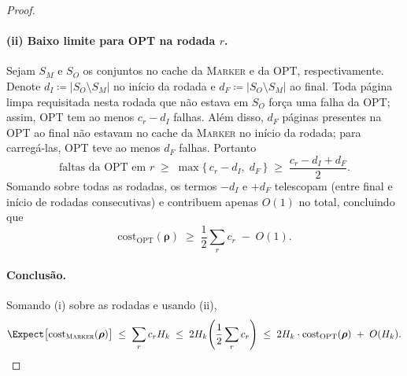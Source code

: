 \begin{theorem}
\begin{proof}
\paragraph{(ii) Baixo limite para OPT na rodada $r$.}
Sejam $S_M$ e $S_O$ os conjuntos no cache da \textsc{Marker} e da OPT, respectivamente.
Denote $d_I \coloneqq |S_O \setminus S_M|$ no início da rodada e $d_F \coloneqq |S_O \setminus S_M|$ ao final.
Toda página limpa requisitada nesta rodada que não estava em $S_O$ força uma falha da OPT; assim, OPT tem ao menos $c_r - d_I$ falhas.
Além disso, $d_F$ páginas presentes na OPT ao final não estavam no cache da \textsc{Marker} no início da rodada; para carregá-las, OPT teve ao menos $d_F$ falhas. Portanto
\[
\text{faltas da OPT em $r$} \;\ge\; \max\{\,c_r - d_I,\; d_F\,\} \;\ge\; \frac{c_r - d_I + d_F}{2}.
\]
Somando sobre todas as rodadas, os termos $-d_I$ e $+d_F$ telescopam (entre final e início de rodadas consecutivas) e contribuem apenas $O(1)$ no total, concluindo que
\[
\mathrm{cost}_{\mathrm{OPT}}(\boldsymbol{\rho}) \;\ge\; \frac12 \sum_r c_r \;-\; O(1).
\]

\paragraph{Conclusão.}
Somando (i) sobre as rodadas e usando (ii),
\[
\Expect\big[\mathrm{cost}_{\textsc{Marker}}(\boldsymbol{\rho})\big]
\;\le\; \sum_r c_r H_k
\;\le\; 2H_k \!\left(\frac12 \sum_r c_r\right)
\;\le\; 2H_k \cdot \mathrm{cost}_{\mathrm{OPT}}(\boldsymbol{\rho}) \;+\; O(H_k).
\]
  \end{proof}
\end{theorem}
